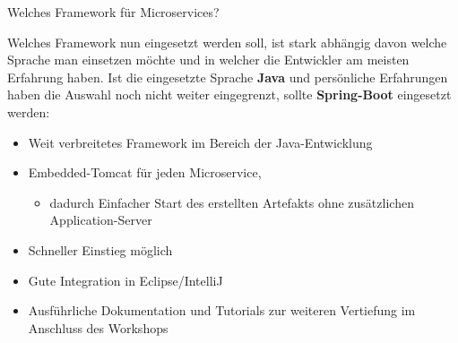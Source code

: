 \documentclass[final]{beamer}
\newlength{\onecolwid}
\newlength{\twocolwid}
\begin{document}
\begin{frame}
\begin{columns}[t]
\begin{column}{\twocolwid}
\begin{columns}[t,totalwidth=\twocolwid]
\begin{column}{\onecolwid}
\begin{block}{Welches Framework für Microservices?}
\begin{figure}
\end{figure}
\par Welches Framework nun eingesetzt werden soll, ist stark abhängig davon welche Sprache man einsetzen möchte und in welcher die Entwickler am meisten Erfahrung haben. Ist die eingesetzte Sprache \textbf{Java} und persönliche Erfahrungen haben die Auswahl noch nicht weiter eingegrenzt, sollte \textbf{Spring-Boot} eingesetzt werden:

\begin{itemize}
	\item Weit verbreitetes Framework im Bereich der Java-Entwicklung
	\item Embedded-Tomcat für jeden Microservice,
	\begin{itemize}
	\item  dadurch Einfacher Start des erstellten Artefakts ohne zusätzlichen Application-Server
	\end{itemize}
	\item Schneller Einstieg möglich
	\item Gute Integration in Eclipse/IntelliJ
	\item Ausführliche Dokumentation und Tutorials zur weiteren Vertiefung im Anschluss des Workshops
\end{itemize}
	


\end{block}


\end{column} %

\end{columns} %





\begin{columns}[t,totalwidth=\twocolwid] %

\begin{column}{\onecolwid} %


\end{column}
\end{columns}
\end{column}
\end{columns}
\end{frame}
\end{document}
